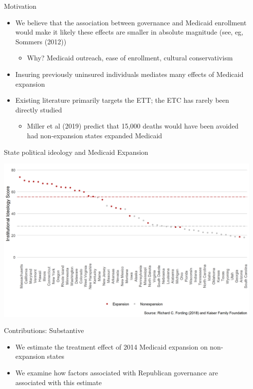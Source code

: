 \documentclass[hyperref={pdfpagelabels=false}]{beamer}
\begin{document}
\begin{frame}{Motivation}
    \begin{itemize}
    \item We believe that the association between governance and Medicaid enrollment would make it likely these effects are smaller in absolute magnitude (see, eg, Sommers (2012)) \bigskip
    \begin{itemize}
        \item Why? Medicaid outreach, ease of enrollment, cultural conservativism
    \end{itemize}
    \item Insuring previously uninsured individuals mediates many effects of Medicaid expansion \bigskip
    \item Existing literature primarily targets the ETT; the ETC has rarely been directly studied \bigskip
    \begin{itemize}
        \item Miller et al (2019) predict that 15,000 deaths would have been avoided had non-expansion states expanded Medicaid \bigskip
    \end{itemize}
    \end{itemize} 
\end{frame}

\begin{frame}{State political ideology and Medicaid Expansion}
    \begin{center}
	\includegraphics[scale=0.5]{01_Plots/political-expansion-plot.png}
    \end{center}
\end{frame}

\begin{frame}{Contributions: Substantive}
\begin{itemize}
    \item We estimate the treatment effect of 2014 Medicaid expansion on non-expansion states \bigskip
    
    \item We examine how factors associated with Republican governance are associated with this estimate \bigskip
    
    \end{itemize}
\end{frame}
\end{document}
